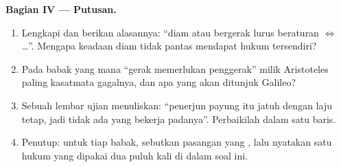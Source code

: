 \begin{problem}
\medskip
\noindent\textbf{Bagian IV --- Putusan.}
\begin{enumerate}[resume]
  \item Lengkapi dan berikan alasannya: ``diam atau bergerak lurus
        beraturan $\iff$ \dots''. Mengapa keadaan diam tidak pantas
        mendapat hukum tersendiri?
  \item Pada babak yang mana ``gerak memerlukan penggerak'' milik
        Aristoteles paling kasatmata gagalnya, dan apa yang akan
        ditunjuk Galileo?
  \item Sebuah lembar ujian menuliskan: ``penerjun payung itu jatuh
        dengan laju tetap, jadi tidak ada  yang bekerja padanya''.
        Perbaikilah dalam satu baris.
  \item Penutup: untuk tiap babak, sebutkan pasangan  yang , lalu nyatakan satu hukum yang dipakai dua puluh
        kali di dalam soal ini.
\end{enumerate}
\end{problem}

